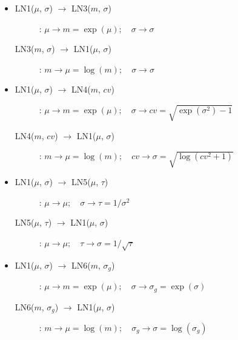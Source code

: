 {\begin{itemize}
\begin{description}
\item[LN2($\mu$, $v$) $\rightarrow$ LN1($\mu$, $\sigma$)]:
$\mu \rightarrow \mu; \quad v \rightarrow \sigma = \sqrt{v}$
\end{description}

\item 
\begin{description}
\item[LN1($\mu$, $\sigma$) $\rightarrow$ LN3($m$, $\sigma$)]:
$\mu \rightarrow m=\exp(\mu); \quad \sigma \rightarrow \sigma$

\item[LN3($m$, $\sigma$) $\rightarrow$ LN1($\mu$, $\sigma$)]:
$m \rightarrow \mu=\log(m); \quad \sigma \rightarrow \sigma$
\end{description}

\item 
\begin{description}
\item[LN1($\mu$, $\sigma$) $\rightarrow$ LN4($m$, $cv$)]:
$\mu \rightarrow m=\exp(\mu); \quad \sigma \rightarrow cv=\sqrt{\exp(\sigma^2)-1}$

\item[LN4($m$, $cv$) $\rightarrow$ LN1($\mu$, $\sigma$)]:
$m \rightarrow \mu=\log(m); \quad cv \rightarrow \sigma=\sqrt{\log(cv^2 + 1)}$
\end{description}

\item 
\begin{description}
\item[LN1($\mu$, $\sigma$) $\rightarrow$ LN5($\mu$, $\tau$)]:
$\mu \rightarrow \mu; \quad \sigma \rightarrow \tau=1/\sigma^2$

\item[LN5($\mu$, $\tau$) $\rightarrow$ LN1($\mu$, $\sigma$)]:
$\mu \rightarrow \mu; \quad \tau \rightarrow \sigma=1/\sqrt{\tau}$
\end{description}

\item 
\begin{description}
\item[LN1($\mu$, $\sigma$) $\rightarrow$ LN6($m$, $\sigma_g$)]:
$\mu \rightarrow m=\exp(\mu); \quad \sigma \rightarrow \sigma_g=\exp(\sigma)$

\item[LN6($m$, $\sigma_g$) $\rightarrow$ LN1($\mu$, $\sigma$)]:
$m \rightarrow \mu=\log(m); \quad \sigma_g \rightarrow \sigma=\log(\sigma_g)$
\end{description}



\end{itemize}}
